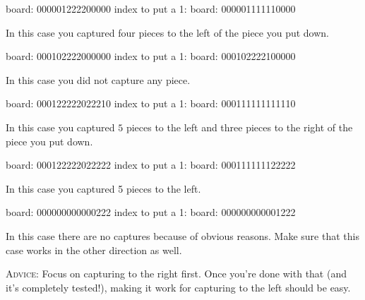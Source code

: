 \nextt
\begin{console}[frame=single, commandchars=\\\{\}]
board: 000001222200000
index to put a 1: 
board: 000001111110000
\end{console}
In this case you captured four pieces to the left of the piece you put down.

\nextt
\begin{console}[frame=single, commandchars=\\\{\}]
board: 000102222000000
index to put a 1: 
board: 000102222100000
\end{console}
In this case you did not capture any piece.

\nextt
\begin{console}[frame=single, commandchars=\\\{\}]
board: 000122222022210
index to put a 1: 
board: 000111111111110
\end{console}
In this case you captured $5$ pieces to the left and three pieces to the right
of the piece you put down.

\nextt
\begin{console}[frame=single, commandchars=\\\{\}]
board: 000122222022222
index to put a 1: 
board: 000111111122222
\end{console}
In this case you captured 5 pieces to the left.

\nextt
\begin{console}[frame=single, commandchars=\\\{\}]
board: 000000000000222
index to put a 1: 
board: 000000000001222
\end{console}
In this case there are no captures because of obvious reasons.
Make sure that this case works in the other direction as well.

\textsc{Advice}:
Focus on capturing to the right first. Once you're done with that (and
it's completely tested!), making it work for capturing to the left should be
easy.
